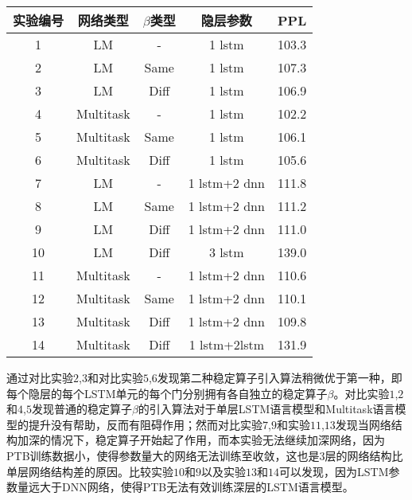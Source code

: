 \begin{table}[!hpb]
  \centering
   \begin{tabular}{ c| c c  c | c}
            \hline
            实验编号 &
            网络类型 &
            $\beta$类型 &
            隐层参数 &
            PPL \\
           \hline
			1 &LM&-&1 lstm&103.3 \\
			2&LM&Same&1 lstm&107.3\\            
			3&LM&Diff&1 lstm&106.9\\
			4&Multitask&-&1 lstm&102.2\\
			5&Multitask&Same&1 lstm&106.1\\
			6&Multitask&Diff&1 lstm&105.6\\
			7&LM&-&1 lstm+2 dnn&111.8\\
			8&LM&Same&1 lstm+2 dnn&111.2\\
			9&LM&Diff&1 lstm+2 dnn&111.0\\
			10&LM&Diff&3 lstm&139.0\\
			11&Multitask&-&1 lstm+2 dnn&110.6\\
			12&Multitask&Same&1 lstm+2 dnn&110.1\\
			13&Multitask&Diff&1 lstm+2 dnn&109.8\\
			14&Multitask&Diff&1 lstm+2lstm&131.9\\
            \hline
          \end{tabular}
\end{table}
\footnotetext

通过对比实验$2$,$3$和对比实验$5$,$6$发现第二种稳定算子引入算法稍微优于第一种，即每个隐层的每个LSTM单元的每个门分别拥有各自独立的稳定算子$\beta$。对比实验$1$,$2$和$4$,$5$发现普通的稳定算子$\beta$的引入算法对于单层LSTM语言模型和Multitask语言模型的提升没有帮助，反而有阻碍作用；然而对比实验$7$,$9$和实验$11$,$13$发现当网络结构加深的情况下，稳定算子开始起了作用，而本实验无法继续加深网络，因为PTB训练数据小，使得参数量大的网络无法训练至收敛，这也是$3$层的网络结构比单层网络结构差的原因。比较实验$10$和$9$以及实验$13$和$14$可以发现，因为LSTM参数量远大于DNN网络，使得PTB无法有效训练深层的LSTM语言模型。

